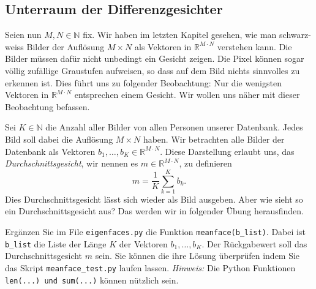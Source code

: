 \subsection{Unterraum der Differenzgesichter}
Seien nun $M,N\in\mathbb N$ fix.
Wir haben im letzten Kapitel gesehen, wie man schwarz-weiss Bilder der Auflösung $M\times N$ als Vektoren in $\mathbb R^{M\cdot N}$ verstehen kann.
Die Bilder müssen dafür nicht unbedingt ein Gesicht zeigen.
Die Pixel können sogar völlig zufällige Graustufen aufweisen, so dass auf dem Bild nichts sinnvolles zu erkennen ist.
Dies führt uns zu folgender Beobachtung:
Nur die wenigsten Vektoren in $\mathbb R^{M\cdot N}$ entsprechen einem Gesicht.
Wir wollen uns näher mit dieser Beobachtung befassen.

Sei $K\in\mathbb N$ die Anzahl aller Bilder von allen Personen unserer Datenbank.
Jedes Bild soll dabei die Auflösung $M\times N$ haben.
Wir betrachten alle Bilder der Datenbank als Vektoren $b_1,\ldots,b_K\in\mathbb R^{M\cdot N}$.
Diese Darstellung erlaubt uns, das \textit{Durchschnittsgesicht}, wir nennen es $m\in\mathbb R^{M\cdot N}$, zu definieren
\begin{equation*}
	m=\frac{1}{K}\sum\limits_{k=1}^Kb_k.
\end{equation*}
Dies Durchschnittsgesicht lässt sich wieder als Bild ausgeben.
Aber wie sieht so ein Durchschnittsgesicht aus?
Das werden wir in folgender Übung herausfinden.
\begin{aufgabe}
	Ergänzen Sie im File \texttt{eigenfaces.py} die Funktion \texttt{meanface(b\_list)}.
	Dabei ist \texttt{b\_list} die Liste der Länge $K$ der Vektoren $b_1,\ldots,b_K$.
	Der Rückgabewert soll das Durchschnittsgesicht $m$ sein.
	Sie können die ihre Lösung überprüfen indem Sie das Skript \texttt{meanface\_test.py} laufen lassen.
	\textit{Hinweis:} Die Python Funktionen \texttt{len(...) und sum(...)} können nützlich sein.
\end{aufgabe}
